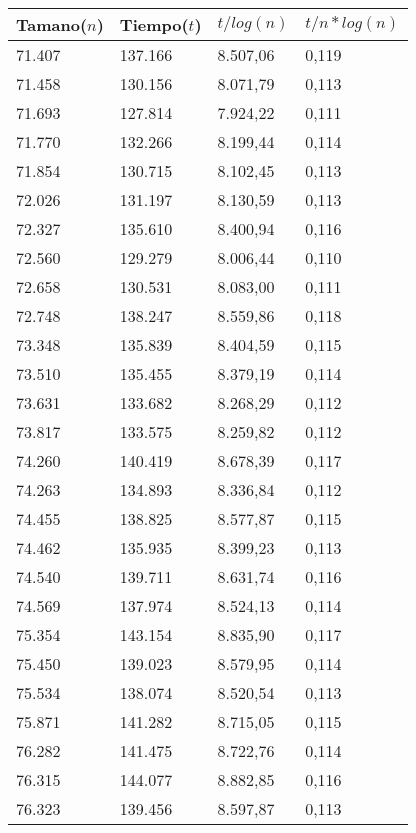 \begin{table}[H]
\parbox{0.3\textwidth}{
  \begin{tabular}{| l | l | l |l |}
    \hline
    Tamano($n$) & Tiempo($t$) & $t / log(n)$ & $t / n*log(n)$ \\ \hline
71.407	&	137.166	&	8.507,06	&	0,119	\\ \hline
71.458	&	130.156	&	8.071,79	&	0,113	\\ \hline
71.693	&	127.814	&	7.924,22	&	0,111	\\ \hline
71.770	&	132.266	&	8.199,44	&	0,114	\\ \hline
71.854	&	130.715	&	8.102,45	&	0,113	\\ \hline
72.026	&	131.197	&	8.130,59	&	0,113	\\ \hline
72.327	&	135.610	&	8.400,94	&	0,116	\\ \hline
72.560	&	129.279	&	8.006,44	&	0,110	\\ \hline
72.658	&	130.531	&	8.083,00	&	0,111	\\ \hline
72.748	&	138.247	&	8.559,86	&	0,118	\\ \hline
73.348	&	135.839	&	8.404,59	&	0,115	\\ \hline
73.510	&	135.455	&	8.379,19	&	0,114	\\ \hline
73.631	&	133.682	&	8.268,29	&	0,112	\\ \hline
73.817	&	133.575	&	8.259,82	&	0,112	\\ \hline
74.260	&	140.419	&	8.678,39	&	0,117	\\ \hline
74.263	&	134.893	&	8.336,84	&	0,112	\\ \hline
74.455	&	138.825	&	8.577,87	&	0,115	\\ \hline
74.462	&	135.935	&	8.399,23	&	0,113	\\ \hline
74.540	&	139.711	&	8.631,74	&	0,116	\\ \hline
74.569	&	137.974	&	8.524,13	&	0,114	\\ \hline
75.354	&	143.154	&	8.835,90	&	0,117	\\ \hline
75.450	&	139.023	&	8.579,95	&	0,114	\\ \hline
75.534	&	138.074	&	8.520,54	&	0,113	\\ \hline
75.871	&	141.282	&	8.715,05	&	0,115	\\ \hline
76.282	&	141.475	&	8.722,76	&	0,114	\\ \hline
76.315	&	144.077	&	8.882,85	&	0,116	\\ \hline
76.323	&	139.456	&	8.597,87	&	0,113	\\ \hline

\end{tabular}}
\end{table}
